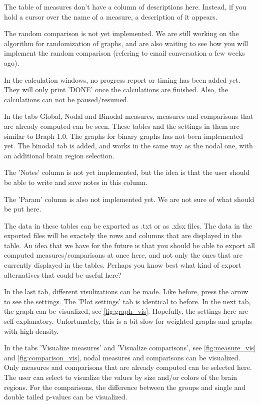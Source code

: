 \documentclass{article}
\begin{document}
The table of measures don't have a column of descriptions here. Instead, if you hold a cursor over the name of a measure, a description of it appears. 

The random comparison is not yet implemented. We are still working on the algorithm for randomization of graphs, and are also waiting to see how you will implement the random comparison (refering to email conversation a few weeks ago).

In the calculation windows, no progress report or timing has been added yet. They will only print 'DONE' once the calculations are finished. Also, the calculations can not be paused/resumed. 

In the tabs Global, Nodal and Binodal measures, measures and comparisons that are already computed can be seen. These tables and the settings in them are similar to Braph 1.0. The graphs for binary graphs has not been implemented yet. The binodal tab is added, and works in the same way as the nodal one, with an additional brain region selection. 

The 'Notes' column is not yet implemented, but the idea is that the user should be able to write and save notes in this column.

The 'Param' column is also not implemented yet. We are not sure of what should be put here.

The data in these tables can be exported as .txt or as .xlsx files. The data in the exported files will be exactely the rows and columns that are displayed in the table. An idea that we have for the future is that you should be able to export all computed measures/comparisons at once here, and not only the ones that are currently displayed in the tables. Perhaps you know best what kind of export alternatives that could be useful here?

In the last tab, different visulizations can be made. Like before, press the arrow to see the settings. The 'Plot settings' tab is identical to before. In the next tab, the graph can be visualized, see \cref{fig:graph_vis}. Hopefully, the settings here are self explanatory. Unfortunately, this is a bit slow for weighted graphs and graphs with high density.

In the tabs 'Visualize measures' and 'Visualize comparisons', see \cref{fig:measure_vis} and \cref{fig:comparison_vis}, nodal measures and comparisons can be visualized. Only measures and comparisons that are already computed can be selected here. The user can select to visualize the values by size and/or colors of the brain regions. For the comparisons, the difference between the groups and single and double tailed p-values can be visualized.
\end{document}
